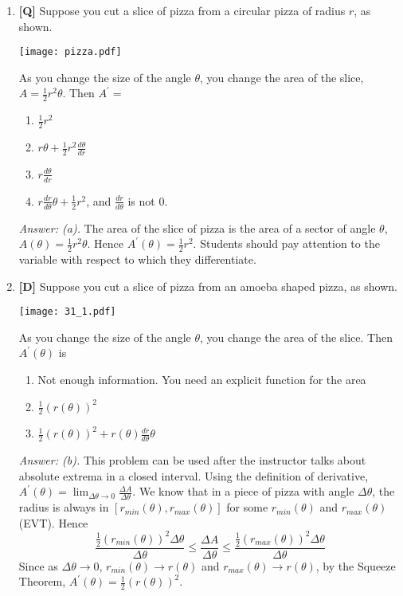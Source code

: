 \documentclass[12pt]{article}
\begin{document}
\begin{enumerate}
\bigskip

\item {\bf [Q]} Suppose you cut a slice of pizza from a 
circular pizza of radius $r$, as shown. 

\begin{center}
%
\texttt{[image: pizza.pdf]}
\end{center}

As you change the size of the angle $\theta$, you change the area of the slice, 
$A=\frac{1}{2}r^2\theta$. Then $A^{\prime}=$
\begin{enumerate}
\item $\frac{1}{2}r^2$
\item $r\theta+\frac{1}{2}r^2\frac{d\theta}{dr}$
\item $r\frac{d\theta}{dr}$
\item $r\frac{dr}{d\theta}\theta+\frac{1}{2}r^2$, and $\frac{dr}{d\theta}$ is not $0$.
\end{enumerate}

{\it Answer: (a).} The area of the slice of pizza is the area of a sector of angle $\theta$, $A(\theta)=\frac{1}{2}r^2\theta$. Hence $A^{\prime}(\theta)=\frac{1}{2}r^2$. Students should pay attention to the variable with respect to which they differentiate.

\item {\bf [D]} Suppose you cut a slice of pizza from an amoeba shaped pizza, as shown. 

\begin{center}
%
\texttt{[image: 31\_1.pdf]}
\end{center}

As you change the size of the angle $\theta$, you change the area of the slice. Then $A^{\prime}(\theta)$ is

\begin {enumerate}
\item Not enough information. You need an explicit function for the area
\item $\frac{1}{2}(r(\theta))^2$
\item $\frac{1}{2}(r(\theta))^2+r(\theta)\frac{dr}{d\theta}\theta$
\end{enumerate}

{\it Answer: (b).} This problem can be used after the instructor talks about absolute extrema in a closed interval. 
Using the definition of derivative, $A^{\prime}(\theta)=\displaystyle{\lim_{\Delta \theta\rightarrow 0}\frac{\Delta A}{\Delta \theta}}$. 
We know that in a piece of pizza with angle $\Delta \theta$, the radius is always in $[r_{min}(\theta),r_{max}(\theta)]$ for some $r_{min}(\theta)$ and $r_{max}(\theta)$ (EVT). Hence 
$$\frac{\frac{1}{2}(r_{min}(\theta))^2\Delta \theta}{\Delta \theta}
\le \frac{ \Delta A}{\Delta \theta}\le \frac{\frac{1}{2}(r_{max}(\theta))^2
\Delta \theta}{\Delta \theta}$$
Since as $\Delta \theta \to 0$, $r_{min}(\theta) \to r(\theta)$ and $r_{max}(\theta) \to r(\theta)$, by the Squeeze Theorem, $A^{\prime}(\theta)
=\frac{1}{2}(r(\theta))^2$.


\end{enumerate}
\end{document}
